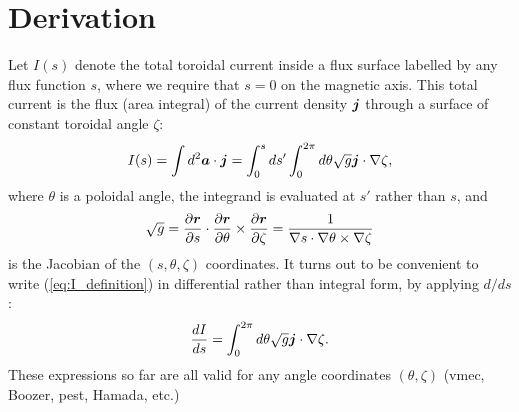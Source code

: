 \documentclass[11pt,letter]{article}
\newcommand{\vect}[1]{\mbox{\boldmath $#1$}}
\newcommand{\vmec}{{\ttfamily vmec}}
\begin{document}
\section{Derivation}

Let $I(s)$ denote the total toroidal current inside a flux surface labelled by any flux function $s$,
where we require that $s=0$ on the magnetic axis.
This total current is the flux (area integral) of the current density $\vect{j}$ through a surface of constant toroidal angle $\zeta$:
\begin{equation}
I(s) = \int d^2\vect{a} \cdot \vect{j}
=\int_0^{s} ds' \int_0^{2\pi}d\theta \sqrt{g} \vect{j}\cdot\nabla\zeta,
\label{eq:I_definition}
\end{equation}
where $\theta$ is a poloidal angle, the integrand is evaluated at $s'$ rather than $s$, and
\begin{equation}
\sqrt{g} = \frac{\partial \vect{r}}{\partial s} \cdot \frac{\partial\vect{r}}{\partial\theta} \times \frac{\partial\vect{r}}{\partial\zeta}
= \frac{1} {\nabla s \cdot \nabla\theta\times\nabla\zeta}
\end{equation}
is the Jacobian of the $(s,\theta,\zeta)$ coordinates. 
It turns out to be convenient to write (\ref{eq:I_definition}) in differential rather than integral form, by applying $d/ds$:
\begin{equation}
\frac{dI}{ds}
= \int_0^{2\pi}d\theta \sqrt{g} \vect{j}\cdot\nabla\zeta.
\label{eq:I_differential}
\end{equation}
These expressions so far are all valid for any angle coordinates $(\theta,\zeta)$ (\vmec, Boozer, {\ttfamily pest}, Hamada, etc.)
\end{document}
